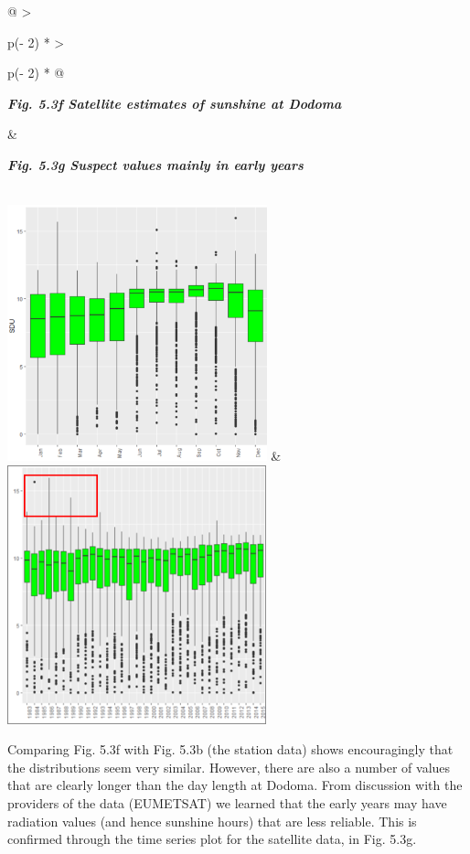 \documentclass[
  letterpaper,
  DIV=11,
  numbers=noendperiod]{scrreprt}
\begin{document}
\begin{longtable}[]{@{}
  >{\raggedright\arraybackslash}p{(\columnwidth - 2\tabcolsep) * }
  >{\raggedright\arraybackslash}p{(\columnwidth - 2\tabcolsep) * }@{}}
\toprule\noalign{}
\begin{minipage}[b]{\linewidth}\raggedright
\textbf{\emph{Fig. 5.3f Satellite estimates of sunshine at Dodoma}}
\end{minipage} & \begin{minipage}[b]{\linewidth}\raggedright
\textbf{\emph{Fig. 5.3g Suspect values mainly in early years}}
\end{minipage} \\
\midrule\noalign{}
\endhead
\bottomrule\noalign{}
\endlastfoot
\includegraphics[width=2.95526in,height=2.91532in]{figures/Fig5.3f.png}
&
\includegraphics[width=2.95443in,height=2.9476in]{figures/Fig5.3g.png} \\
\end{longtable}

Comparing Fig. 5.3f with Fig. 5.3b (the station data) shows
encouragingly that the distributions seem very similar. However, there
are also a number of values that are clearly longer than the day length
at Dodoma. From discussion with the providers of the data (EUMETSAT) we
learned that the early years may have radiation values (and hence
sunshine hours) that are less reliable. This is confirmed through the
time series plot for the satellite data, in Fig. 5.3g.
\end{document}
